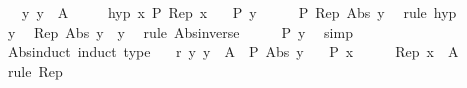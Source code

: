 \begin{isabellebody}
\ \ \ y{\isacharcolon}{\kern0pt}\ {\isachardoublequoteopen}y\ {\isasymin}\ A{\isachardoublequoteclose}\isanewline
\ \ \ \ \ hyp{\isacharcolon}{\kern0pt}\ {\isachardoublequoteopen}{\isasymAnd}x{\isachardot}{\kern0pt}\ P\ {\isacharparenleft}{\kern0pt}Rep\ x{\isacharparenright}{\kern0pt}{\isachardoublequoteclose}\isanewline
\ \ \ {\isachardoublequoteopen}P\ y{\isachardoublequoteclose}\isanewline
%
\isadelimproof
%
\endisadelimproof
%
\isatagproof
{}\isamarkupfalse%
\ {\isacharminus}{\kern0pt}\isanewline
\ \ \isamarkupfalse%
\ {\isachardoublequoteopen}P\ {\isacharparenleft}{\kern0pt}Rep\ {\isacharparenleft}{\kern0pt}Abs\ y{\isacharparenright}{\kern0pt}{\isacharparenright}{\kern0pt}{\isachardoublequoteclose}\ \isamarkupfalse%
\ {\isacharparenleft}{\kern0pt}rule\ hyp{\isacharparenright}{\kern0pt}\isanewline
\ \ \isamarkupfalse%
\ \isamarkupfalse%
\ y\ \isamarkupfalse%
\ {\isachardoublequoteopen}Rep\ {\isacharparenleft}{\kern0pt}Abs\ y{\isacharparenright}{\kern0pt}\ {\isacharequal}{\kern0pt}\ y{\isachardoublequoteclose}\ \isamarkupfalse%
\ {\isacharparenleft}{\kern0pt}rule\ Abs{\isacharunderscore}{\kern0pt}inverse{\isacharparenright}{\kern0pt}\isanewline
\ \ \isamarkupfalse%
\ \isamarkupfalse%
\ {\isachardoublequoteopen}P\ y{\isachardoublequoteclose}\ \isamarkupfalse%
\ simp\isanewline
{}\isamarkupfalse%
%
\endisatagproof
{\isafoldproof}%
%
\isadelimproof
\isanewline
%
\endisadelimproof
\isanewline
{}\isamarkupfalse%
\ Abs{\isacharunderscore}{\kern0pt}induct\ {\isacharbrackleft}{\kern0pt}induct\ type{\isacharbrackright}{\kern0pt}{\isacharcolon}{\kern0pt}\isanewline
\ \ \ r{\isacharcolon}{\kern0pt}\ {\isachardoublequoteopen}{\isasymAnd}y{\isachardot}{\kern0pt}\ y\ {\isasymin}\ A\ {\isasymLongrightarrow}\ P\ {\isacharparenleft}{\kern0pt}Abs\ y{\isacharparenright}{\kern0pt}{\isachardoublequoteclose}\isanewline
\ \ \ {\isachardoublequoteopen}P\ x{\isachardoublequoteclose}\isanewline
%
\isadelimproof
%
\endisadelimproof
%
\isatagproof
{}\isamarkupfalse%
\ {\isacharminus}{\kern0pt}\isanewline
\ \ \isamarkupfalse%
\ {\isachardoublequoteopen}Rep\ x\ {\isasymin}\ A{\isachardoublequoteclose}\ \isamarkupfalse%
\ {\isacharparenleft}{\kern0pt}rule\ Rep{\isacharparenright}{\kern0pt}\isanewline
\ \ \isamarkupfalse%
\ \isamarkupfalse%

\end{isabellebody}
